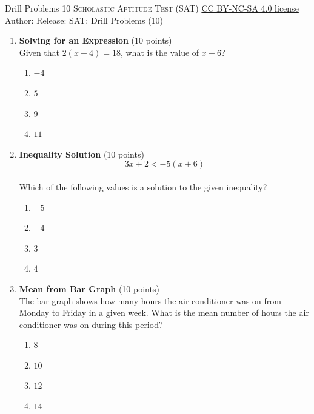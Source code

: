 \newpage\handout
{Drill Problems 10}
{\textsc{Scholastic Aptitude Test (SAT)}}
{\href{https://creativecommons.org/licenses/by-nc-sa/4.0/}{CC BY-NC-SA 4.0 license}}
{Author: \BookAuthor}{Release: \generatedOn}
{SAT: Drill Problems (10)}




\begin{enumerate}
  \item \textbf{Solving for an Expression} (10 points)\\
  Given that $2(x+4)=18$, what is the value of $x+6$?
  \begin{enumerate}[label=\Alph*.]
    \item $-4$
    \item $5$
    \item $9$
    \item $11$
  \end{enumerate}
  \begin{subanswer}
  \end{subanswer}

  \item \textbf{Inequality Solution} (10 points)\\
  $$3x+2<-5(x+6)$$\\
  Which of the following values is a solution to the given inequality?
  \begin{enumerate}[label=\Alph*.]
    \item $-5$
    \item $-4$
    \item $3$
    \item $4$
  \end{enumerate}
  \begin{subanswer}
  \end{subanswer}

  \newpage

  \item \textbf{Mean from Bar Graph} (10 points)\\
  The bar graph shows how many hours the air conditioner was on from Monday to Friday in a given week. What is the mean number of hours the air conditioner was on during this period?
  \begin{enumerate}[label=\Alph*.]
    \item $8$
    \item $10$
    \item $12$
    \item $14$
  \end{enumerate}
  \begin{subanswer}
  \end{subanswer}


\end{enumerate}

